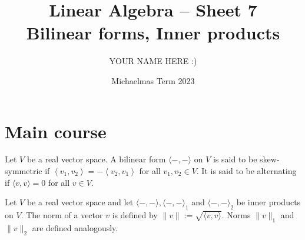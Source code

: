 \documentclass[answers]{exam}
\title{Linear Algebra -- Sheet 7\\Bilinear forms, Inner products}
\author{YOUR NAME HERE :)}
\date{Michaelmas Term 2023}
\begin{document}
\maketitle
\section*{Main course}
\begin{questions}

\question%
Let $V$ be a real vector space. A bilinear form $\langle-,-\rangle$ on $V$ is said to be skew-symmetric if $\left\langle v_{1}, v_{2}\right\rangle=-\left\langle v_{2}, v_{1}\right\rangle$ for all $v_{1}, v_{2} \in V$. It is said to be alternating if $\langle v, v\rangle=0$ for all $v \in V$.



\question%
Let $V$ be a real vector space and let $\langle-,-\rangle,\langle-,-\rangle_{1}$ and $\langle-,-\rangle_{2}$ be inner products on $V$. The norm of a vector $v$ is defined by $\|v\|:=\sqrt{\langle v, v\rangle}$. Norms $\|v\|_{1}$ and $\|v\|_{2}$ are defined analogously.




\end{questions}
\end{document}
